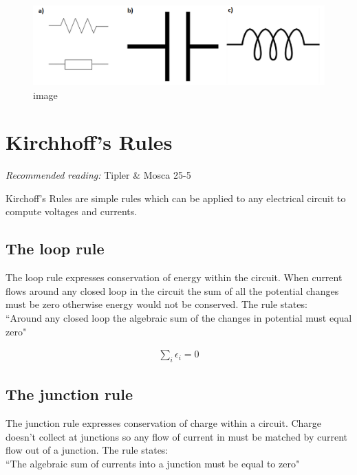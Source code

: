 \documentclass[
]{book}
\begin{document}
\begin{figure}
\centering
\includegraphics[width=120mm,height=\textheight]{Figures/LCR_symbols.png}
\caption{image}
\end{figure}

\hypertarget{kirchhoffs-rules}{%
\section{Kirchhoff's Rules}\label{kirchhoffs-rules}}

\emph{Recommended reading:} Tipler \& Mosca 25-5

Kirchoff's Rules are simple rules which can be applied to any electrical
circuit to compute voltages and currents.

\hypertarget{the-loop-rule}{%
\subsection{The loop rule}\label{the-loop-rule}}

The loop rule expresses conservation of energy within the circuit. When
current flows around any closed loop in the circuit the sum of all the
potential changes must be zero otherwise energy would not be conserved.
The rule states:\\
``Around any closed loop the algebraic sum of the changes in potential
must equal zero"

\[\begin{aligned}
\sum_i \epsilon_i =0
\end{aligned}\]

\hypertarget{the-junction-rule}{%
\subsection{The junction rule}\label{the-junction-rule}}

The junction rule expresses conservation of charge within a circuit.
Charge doesn't collect at junctions so any flow of current in must be
matched by current flow out of a junction. The rule states:\\

``The algebraic sum of currents into a junction must be equal to zero"
\end{document}

